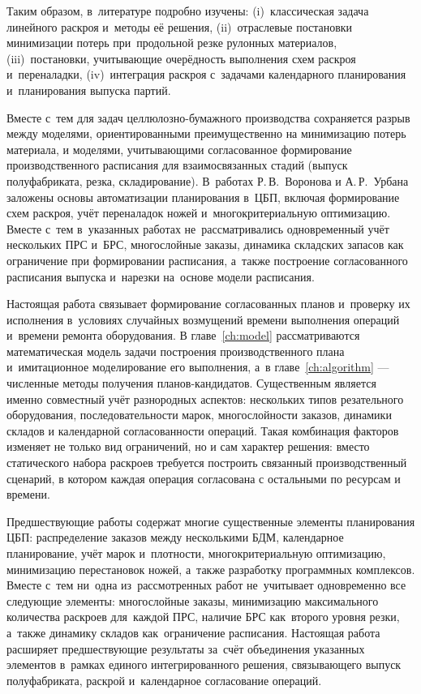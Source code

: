 Таким образом, в~литературе подробно изучены: (i)~классическая задача линейного раскроя и~методы её решения, (ii)~отраслевые постановки минимизации потерь при~продольной резке рулонных материалов, (iii)~постановки, учитывающие очерёдность выполнения схем раскроя и~переналадки, (iv)~интеграция раскроя с~задачами календарного планирования и~планирования выпуска партий.

Вместе с~тем для задач целлюлозно-бумажного производства сохраняется разрыв между моделями, ориентированными преимущественно на минимизацию потерь материала, и моделями, учитывающими согласованное формирование производственного расписания для взаимосвязанных стадий (выпуск полуфабриката, резка, складирование).
В~работах Р.\,В.~Воронова \cite{воронов2004диссертация} и А.\,Р.~Урбана \cite{урбан2015диссертация} заложены основы автоматизации планирования в~ЦБП, включая формирование схем раскроя, учёт переналадок ножей и~многокритериальную оптимизацию.
Вместе с~тем в~указанных работах не~рассматривались одновременный учёт нескольких ПРС и~БРС, многослойные заказы, динамика складских запасов как ограничение при формировании расписания, а~также построение согласованного расписания выпуска и~нарезки на~основе модели расписания.

Настоящая работа связывает формирование согласованных планов и~проверку их исполнения в~условиях случайных возмущений времени выполнения операций и~времени ремонта оборудования. В главе~\ref{ch:model} рассматриваются математическая модель задачи построения производственного плана и~имитационное моделирование его выполнения, а~в главе~\ref{ch:algorithm} --- численные методы получения планов-кандидатов.
Существенным является именно совместный учёт разнородных аспектов: нескольких типов резательного оборудования, последовательности марок, многослойности заказов, динамики складов и календарной согласованности операций. Такая комбинация факторов изменяет не только вид ограничений, но и сам характер решения: вместо статического набора раскроев требуется построить связанный производственный сценарий, в котором каждая операция согласована с остальными по ресурсам и времени.

Предшествующие работы содержат многие существенные элементы планирования ЦБП: распределение заказов между несколькими БДМ, календарное планирование, учёт марок и~плотности, многокритериальную оптимизацию, минимизацию перестановок ножей, а~также разработку программных комплексов.
Вместе с~тем ни~одна из~рассмотренных работ не~учитывает одновременно все следующие элементы: многослойные заказы, минимизацию максимального количества раскроев для~каждой ПРС, наличие БРС как~второго уровня резки, а~также динамику складов как~ограничение расписания.
Настоящая работа расширяет предшествующие результаты за~счёт объединения указанных элементов в~рамках единого интегрированного решения, связывающего выпуск полуфабриката, раскрой и~календарное согласование операций.

